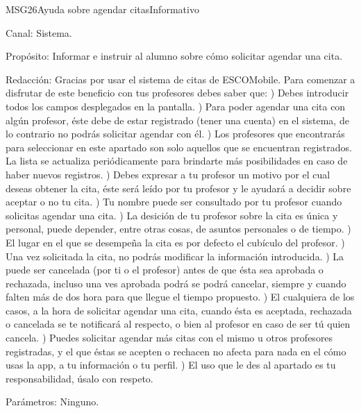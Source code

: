 \begin{mensaje}{MSG26}{Ayuda sobre agendar citas}{Informativo}
	\item[Canal:] Sistema.
    \item[Propósito:] Informar e instruir al alumno sobre cómo solicitar agendar una cita. 
    \item[Redacción:] 
		Gracias por usar el sistema de citas de ESCOMobile.
		\newline
		Para comenzar a disfrutar de este beneficio con tus profesores debes saber que:
		) Debes introducir todos los campos desplegados en la pantalla.
		) Para poder agendar una cita con algún profesor, éste debe de estar registrado (tener una cuenta) en el sistema, de lo contrario no podrás solicitar agendar con él. 
		) Los profesores que encontrarás para seleccionar en este apartado son solo aquellos que se encuentran registrados. La lista se actualiza periódicamente para brindarte más posibilidades en caso de haber nuevos registros.  
		) Debes expresar a tu profesor un motivo por el cual deseas obtener la cita, éste será leído por tu profesor y le ayudará a decidir sobre aceptar o no tu cita.
		) Tu nombre puede ser consultado por tu profesor cuando solicitas agendar una cita.
		) La desición de tu profesor sobre la cita es única y personal, puede depender, entre otras cosas, de asuntos personales o de tiempo.
		) El lugar en el que se desempeña la cita es por defecto el cubículo del profesor.
		) Una vez solicitada la cita, no podrás modificar la información introducida.
		) La puede ser cancelada (por ti o el profesor) antes de que ésta sea aprobada o rechazada, incluso una ves aprobada podrá se podrá cancelar, siempre y cuando falten más de dos hora para que llegue el tiempo propuesto.
		) El cualquiera de los casos, a la hora de solicitar agendar una cita, cuando ésta es aceptada, rechazada o cancelada se te notificará al respecto, o bien al profesor en caso de ser tú quien cancela.
		) Puedes solicitar agendar más citas con el mismo u otros profesores registradas, y el que éstas se acepten o rechacen no afecta para nada en el cómo usas la app, a tu información o tu perfil. 
		) El uso que le des al apartado es tu responsabilidad, úsalo con respeto.				  
    \item[Parámetros:] Ninguno.	


\end{mensaje}
